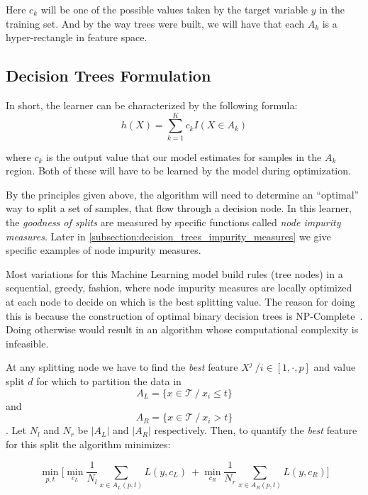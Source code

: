 Here $c_k$ will be one of the possible values taken by the target variable $y$ in the training set.
And by the way trees were built, we will have that each $A_k$ is a hyper-rectangle in feature space.

\subsection{Decision Trees Formulation}\label{subsection:decision_trees_formulation}
In short, the learner can be characterized by the following formula:
\begin{equation}
\label{eq:decisionTreeModel}
h(X) = \sum_{k=1}^K c_k I(X \in A_k)
\end{equation}

where $c_k$ is the output value that our model estimates for samples in the $A_k$ region.
Both of these will have to be learned by the model during optimization. %

By the principles given above, the algorithm will need to determine an ``optimal'' way to split a set of samples, that flow through a decision node.
In this learner, the \textit{goodness of splits} are measured by specific functions called \textit{node impurity measures}.
Later in \cref{subsection:decision_trees_impurity_measures} we give specific examples of node impurity measures.

Most variations for this Machine Learning model build rules (tree nodes) in a sequential, greedy, fashion, where node impurity measures are locally optimized at each node to decide on which is the best splitting value.
The reason for doing this is because the construction of optimal binary decision trees is NP-Complete~\citep{decisionTreesNP}.
Doing otherwise would result in an algorithm whose computational complexity is infeasible.

At any splitting node we have to find the \textit{best} feature $X^j \ / i \in [1,\cdot,p] $ and value split $d$ for which to partition the data in
$$A_L = \{x \in \mathcal{T} \ / \ x_i \leq t \} $$
and
$$A_R = \{x \in \mathcal{T}\ / \ x_i> t \} $$.
Let $N_l$ and $N_r$ be $|A_L|$ and $|A_R|$
 respectively.
 Then, to quantify the \textit{best} feature for this split the algorithm minimizes:


\begin{equation}
\label{eq:decisionTreeGreedyOptimization}
\min_{p,t} \big[ \min_{c_L }  \frac{1}{N_l}\sum_{x \in A_L(p,t) } L(y,c_L)    \ +  \min_{c_R}  \frac{1}{N_r}\sum_{x \in A_R(p,t) } L(y,c_R) \big]
\end{equation}

